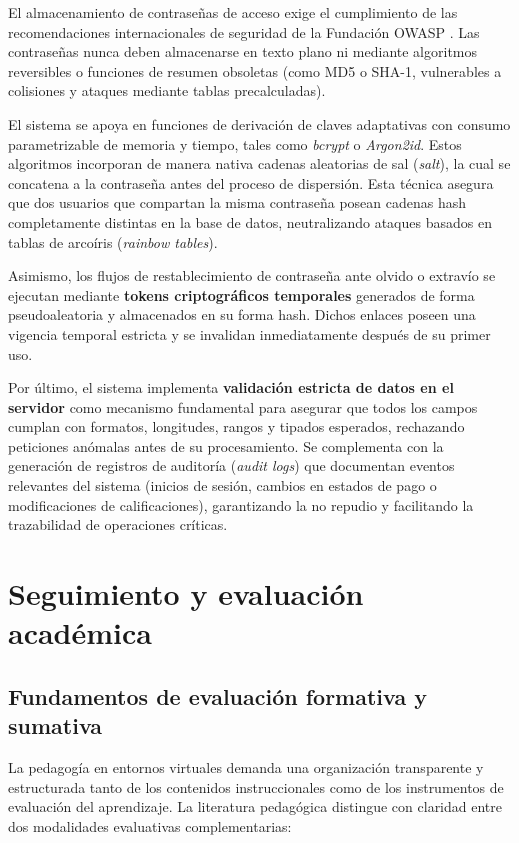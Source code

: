 El almacenamiento de contraseñas de acceso exige el cumplimiento de las recomendaciones internacionales de seguridad de la Fundación OWASP \cite{owasp2026password}. Las contraseñas nunca deben almacenarse en texto plano ni mediante algoritmos reversibles o funciones de resumen obsoletas (como MD5 o SHA-1, vulnerables a colisiones y ataques mediante tablas precalculadas).

El sistema se apoya en funciones de derivación de claves adaptativas con consumo parametrizable de memoria y tiempo, tales como \textit{bcrypt} o \textit{Argon2id}. Estos algoritmos incorporan de manera nativa cadenas aleatorias de sal (\textit{salt}), la cual se concatena a la contraseña antes del proceso de dispersión. Esta técnica asegura que dos usuarios que compartan la misma contraseña posean cadenas hash completamente distintas en la base de datos, neutralizando ataques basados en tablas de arcoíris (\textit{rainbow tables}).

Asimismo, los flujos de restablecimiento de contraseña ante olvido o extravío se ejecutan mediante \textbf{tokens criptográficos temporales} generados de forma pseudoaleatoria y almacenados en su forma hash. Dichos enlaces poseen una vigencia temporal estricta y se invalidan inmediatamente después de su primer uso.

Por último, el sistema implementa \textbf{validación estricta de datos en el servidor} como mecanismo fundamental para asegurar que todos los campos cumplan con formatos, longitudes, rangos y tipados esperados, rechazando peticiones anómalas antes de su procesamiento. Se complementa con la generación de registros de auditoría (\textit{audit logs}) que documentan eventos relevantes del sistema (inicios de sesión, cambios en estados de pago o modificaciones de calificaciones), garantizando la no repudio y facilitando la trazabilidad de operaciones críticas.

\section{Seguimiento y evaluación académica}

\subsection{Fundamentos de evaluación formativa y sumativa}

La pedagogía en entornos virtuales demanda una organización transparente y estructurada tanto de los contenidos instruccionales como de los instrumentos de evaluación del aprendizaje. La literatura pedagógica distingue con claridad entre dos modalidades evaluativas complementarias:

